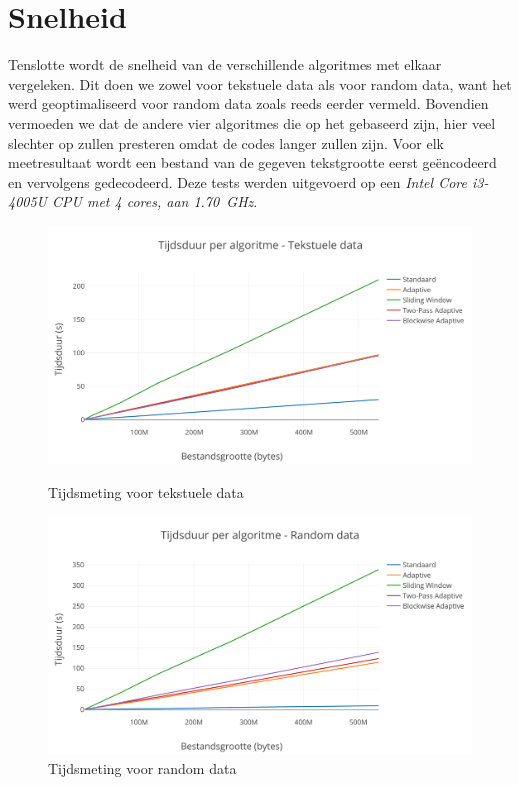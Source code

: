 \section{Snelheid}
Tenslotte wordt de snelheid van de verschillende algoritmes met elkaar vergeleken. Dit doen we zowel voor tekstuele data als voor random data, want het \huffstd werd geoptimaliseerd voor random data zoals reeds eerder vermeld. Bovendien vermoeden we dat de andere vier algoritmes die op het \huffadap gebaseerd zijn, hier veel slechter op zullen presteren omdat de codes langer zullen zijn. Voor elk meetresultaat wordt een bestand van de gegeven tekstgrootte eerst ge\"encodeerd en vervolgens gedecodeerd. Deze tests werden uitgevoerd op een \emph{Intel Core i3-4005U CPU met 4 cores, aan \SI{1.70}{\giga\hertz}}.
\begin{figure}[p]
	\centering
	\includegraphics[width=\linewidth]{resources/timing-regular.png}
	\caption{Tijdsmeting voor tekstuele data}
\bigbreak
	\centering
	\includegraphics[width=\linewidth]{resources/timing-random.png}
	\caption{Tijdsmeting voor random data}
\end{figure}
\newpage

